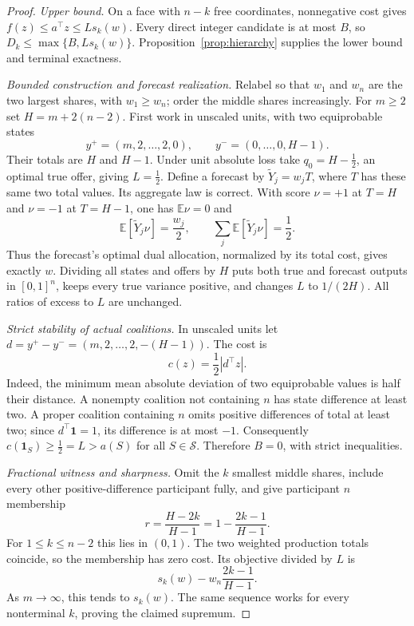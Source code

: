 \documentclass[11pt,a4paper]{article}
\theoremstyle{remark}
\newcommand{\E}{\mathbb E}
\newcommand{\one}{\mathbf 1}
\newcommand{\subsets}{\mathcal S}
\begin{document}
\begin{proof}
\textit{Upper bound.}
On a face with $n-k$ free coordinates, nonnegative cost gives
$f(z)\le a^\top z\le Ls_k(w)$. Every direct integer candidate is at most
$B$, so $D_k\le\max\{B,Ls_k(w)\}$. Proposition~\ref{prop:hierarchy}
supplies the lower bound and terminal exactness.

\textit{Bounded construction and forecast realization.}
Relabel so that $w_1$ and $w_n$ are the two largest shares, with
$w_1\ge w_n$; order the middle shares increasingly. For $m\ge2$ set
$H=m+2(n-2)$. First work in unscaled units, with two equiprobable states
\begin{equation}\label{eq:states}
 y^+=(m,2,\ldots,2,0),\qquad
 y^-=(0,\ldots,0,H-1).
\end{equation}
Their totals are $H$ and $H-1$. Under unit absolute loss take
$q_0=H-\tfrac12$, an optimal true offer, giving $L=\tfrac12$.
Define a forecast by $\widetilde Y_j=w_jT$, where $T$ has these same two
total values. Its aggregate law is correct. With score $\nu=+1$ at $T=H$
and $\nu=-1$ at $T=H-1$, one has $\E\nu=0$ and
\[
 \E[\widetilde Y_j\nu]=\frac{w_j}{2},\qquad
 \sum_j\E[\widetilde Y_j\nu]=\frac12.
\]
Thus the forecast's optimal dual allocation, normalized by its total
cost, gives exactly $w$. Dividing all states and offers by $H$ puts
both true and forecast outputs in $[0,1]^n$, keeps every true variance
positive, and changes $L$ to $1/(2H)$. All ratios of excess to $L$
are unchanged.

\textit{Strict stability of actual coalitions.}
In unscaled units let
$d=y^+-y^-=(m,2,\ldots,2,-(H-1))$. The cost is
\begin{equation}\label{eq:absolute}
 c(z)=\frac12|d^\top z|.
\end{equation}
Indeed, the minimum mean absolute deviation of two equiprobable
values is half their distance. A nonempty coalition not containing
$n$ has state difference at least two. A proper coalition containing
$n$ omits positive differences of total at least two; since
$d^\top\one=1$, its difference is at most $-1$.
Consequently $c(\one_S)\ge\tfrac12=L>a(S)$ for all
$S\in\subsets$. Therefore $B=0$, with strict inequalities.

\textit{Fractional witness and sharpness.}
Omit the $k$ smallest middle shares, include every other
positive-difference participant fully, and give participant $n$
membership
\[
 r=\frac{H-2k}{H-1}=1-\frac{2k-1}{H-1}.
\]
For $1\le k\le n-2$ this lies in $(0,1)$. The two weighted
production totals coincide, so the membership has zero cost.
Its objective divided by $L$ is
\begin{equation}\label{eq:family}
 s_k(w)-w_n\frac{2k-1}{H-1}.
\end{equation}
As $m\to\infty$, this tends to $s_k(w)$. The same sequence
works for every nonterminal $k$, proving the claimed supremum.
\end{proof}
\end{document}

